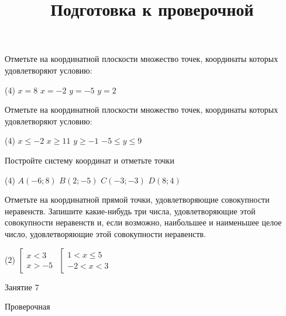 \begin{homework}[number=3]
	\begin{listofex}
		\item Отметьте на координатной плоскости множество точек, координаты которых удовлетворяют условию:
		\begin{tasks}(4)
			\task \( x=8 \)
			\task \( x=-2 \)
			\task \( y=-5 \)
			\task \( y=2 \)
		\end{tasks}
			\item Отметьте на координатной плоскости множество точек, координаты которых удовлетворяют условию:
		\begin{tasks}(4)
			\task \( x \le -2 \)
			\task \( x \ge 11 \)
			\task \( y \ge -1 \)
			\task \( -5 \le y \le 9 \)
		\end{tasks}
		\item Постройте систему координат и отметьте точки
		\begin{tasks}(4)
			\task \( A(-6;8) \)
			\task \( B(2;-5) \)
			\task \( C(-3;-3) \)
			\task \( D(8;4) \)
		\end{tasks}
		\item Отметьте на координатной прямой точки, удовлетворяющие совокупности неравенств. Запишите какие-нибудь три числа, удовлетворяющие этой совокупности неравенств и, если возможно, наибольшее и наименьшее целое число, удовлетворяющие этой совокупности неравенств.
		\begin{tasks}(2)
			\task \( \left[ 
			\begin{array}{l} x<3\\ x>-5 \end{array} \right. \)
			\task \( \left[
			\begin{array}{l} 1 <x \le 5 \\ -2 < x < 3 \end{array} \right. \)
		\end{tasks}
	\end{listofex}
\end{homework}

\begin{class}[number=7]
	\title{Подготовка к проверочной}
	\begin{listofex}
		\item Занятие 7
	\end{listofex}
\end{class}

\begin{exam}
	\begin{listofex}
		\item Проверочная
	\end{listofex}
\end{exam}
